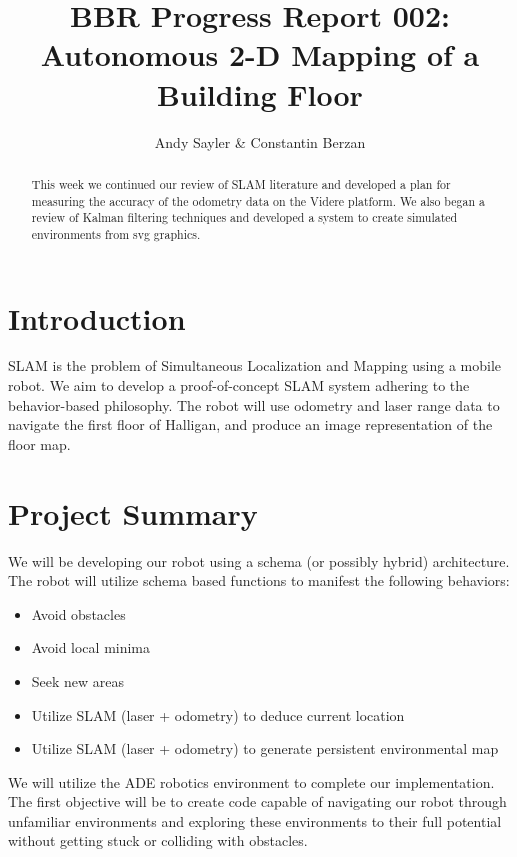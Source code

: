 \documentclass[12pt]{article}
\begin{document}
\title{BBR Progress Report 002:\\ Autonomous 2-D Mapping of a Building Floor}
\author{Andy Sayler \& Constantin Berzan}
\maketitle

\begin{abstract}
This week we continued our review of SLAM literature and developed a plan
for measuring the accuracy of the odometry data on the Videre platform. We
also began a review of Kalman filtering techniques and developed a system
to create simulated environments from svg graphics.
\end{abstract}


\section{Introduction}
SLAM is the problem of Simultaneous Localization and Mapping using a mobile
robot.  We aim to develop a proof-of-concept SLAM system adhering to the
behavior-based philosophy.  The robot will use odometry and laser range data to
navigate the first floor of Halligan, and produce an image representation of
the floor map.


\section{Project Summary}

We will be developing our robot using a schema (or possibly hybrid)
architecture. The robot will utilize schema based functions to manifest the
following behaviors:

\begin{itemize}
    \setlength{\itemsep}{0pt}
    \setlength{\parskip}{0pt}
    \setlength{\parsep}{0pt}
    \item Avoid obstacles
    \item Avoid local minima
    \item Seek new areas
    \item Utilize SLAM (laser + odometry) to deduce current location
    \item Utilize SLAM (laser + odometry) to generate persistent environmental
          map
\end{itemize}

We will utilize the ADE robotics environment to complete our implementation.
The first objective will be to create code capable of navigating our robot
through unfamiliar environments and exploring these environments to their full
potential without getting stuck or colliding with obstacles. 
\end{document}
